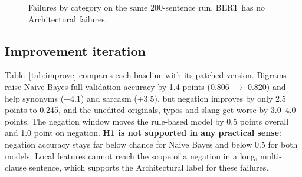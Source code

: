 \documentclass[conference]{IEEEtran}
\begin{document}
\begin{figure}[t]
\centering
{}
\caption{Failures by category on the same 200-sentence run. BERT has no Architectural failures.}
\label{fig:fail}
\end{figure}

\subsection{Improvement iteration}\label{sec:improve}
Table~\ref{tab:improve} compares each baseline with its patched version. Bigrams raise Naive Bayes
full-validation accuracy by 1.4 points (0.806 $\rightarrow$ 0.820) and help synonyms (+4.1) and
sarcasm (+3.5), but negation improves by only 2.5 points to 0.245, and the unedited originals,
typos and slang get worse by 3.0--4.0 points. The negation window moves the rule-based model by 0.5
points overall and 1.0 point on negation. \textbf{H1 is not supported in any practical sense}:
negation accuracy stays far below chance for Naive Bayes and below 0.5 for both models. Local
features cannot reach the scope of a negation in a long, multi-clause sentence, which supports the
Architectural label for these failures.
\end{document}
